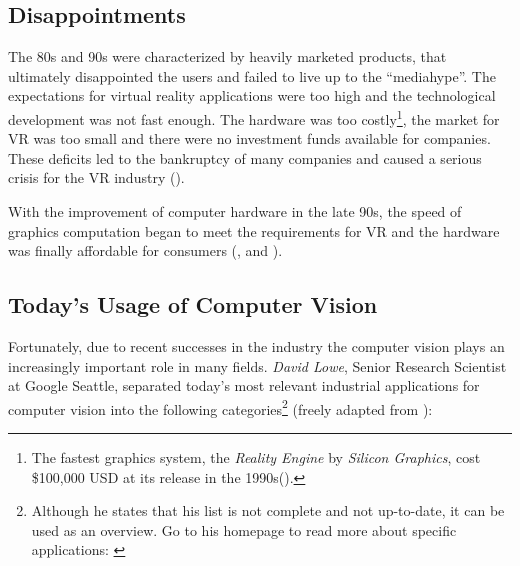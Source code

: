 \subsection{Disappointments}
The 80s and 90s were characterized by heavily marketed products, that ultimately disappointed the users and failed to live up to the \enquote{mediahype}. The expectations for virtual reality applications were too high and the technological development was not fast enough. The hardware was too costly\footnote{The fastest graphics system, the \textit{Reality Engine} by \textit{Silicon Graphics}, cost \$100,000 USD at its release in the 1990s(\cite[p.10]{Burdea.2003}).}, the market for VR was too small and there were no investment funds available for companies. These deficits led to the bankruptcy of many companies and caused a serious crisis for the VR industry (\cite[p.10]{Burdea.2003}). 

With the improvement of computer hardware in the late 90s, the speed of graphics computation began to meet the requirements for VR and the hardware was finally affordable for consumers (\cite[p.10 et seq.]{Burdea.2003}, \cite{Doerner.2013} and \cite[p.3]{Toennis.2010}).

\subsection{Today's Usage of Computer Vision}\label{ssec:Today}
Fortunately, due to recent successes in the industry the computer vision plays an increasingly important role in many fields. \textit{David Lowe}, Senior Research Scientist at Google Seattle, separated today's most relevant industrial applications for computer vision into the following categories\footnote{Although he states that his list is not complete and not up-to-date, it can be used as an overview. Go to his homepage to read more about specific applications: \cite{Lowe.2016}} (freely adapted from \cite{Lowe.2016}): 

